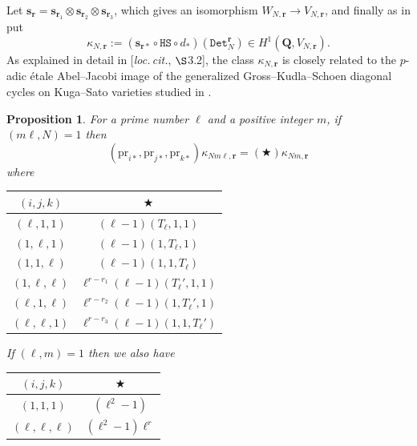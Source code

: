 \documentclass[10pt,letterpaper]{amsart}
\theoremstyle{plain}
\theoremstyle{definition}
\newtheorem{rmk}[thm]{Remark}
\theoremstyle{definition}
\theoremstyle{plain}
\newtheorem{prop}[thm]{Proposition}
\theoremstyle{plain}
\theoremstyle{plain}
\theoremstyle{remark}
\numberwithin{equation}{section}
\newcommand{\Q}{\mathbf{Q}}
\begin{document}
Let $\mathbf{s}_{\mathbf{r}}=\mathbf{s}_{\mathbf{r}_1}\otimes \mathbf{s}_{\mathbf{r}_2}\otimes \mathbf{s}_{\mathbf{r}_3}$, which gives an isomorphism $W_{N,\mathbf{r}}\rightarrow V_{N,\mathbf{r}}$, and finally as in \cite{BSV} put
\begin{equation}\label{BSVconstructclass}
    \kappa_{N,\mathbf{r}}:=(\mathbf{s}_{\mathbf{r}*}\circ\mathtt{HS}\circ d_{*})(\mathtt{Det}^{\mathbf{r}}_N)\in H^1(\Q,V_{N,\mathbf{r}}).
\end{equation}
As explained in detail in  [\emph{loc.\,cit.}, $\S${3.2}], the class  $\kappa_{N,\mathbf{r}}$ is closely related to the $p$-adic \'etale Abel--Jacobi image of the generalized Gross--Kudla--Schoen diagonal cycles on Kuga--Sato varieties studied in \cite{DR1}.


\begin{prop}\label{table}
For a prime number $\ell$ and a positive integer $m$, if $(m\ell,N)=1$ then
\begin{equation*}
({\mathrm{pr}}_{i*},{\mathrm{pr}}_{j*},{\mathrm{pr}}_{k*})\kappa_{Nm\ell,\textbf{r}}= (\bigstar)\kappa_{Nm,\textbf{r}}
\end{equation*}
where
\begin{center}
\begin{tabular}{|c|c| } 
 \hline
 $(i,j,k)$ & $\bigstar$  \\ 
 \hline
  $(\ell,1,1)$& $(\ell-1)(T_\ell,1,1)$  \\ 
  $(1,\ell,1)$&  $(\ell-1)(1,T_\ell,1)$     \\
  $(1,1,\ell)$& $(\ell-1)(1,1,T_\ell)$ \\
  $(1,\ell,\ell)$& $\ell^{r-r_1}(\ell-1)(T_\ell',1,1)$\\
  $(\ell,1,\ell)$& $\ell^{r-r_2}(\ell-1)(1,T_\ell',1)$ \\
  $(\ell,\ell,1)$& $\ell^{r-r_3}(\ell-1)(1,1,T_\ell')$ \\
 \hline
\end{tabular}
\end{center}
If $(\ell,m)=1$ then we also have
\begin{center}
\begin{tabular}{|c|c| } 
 \hline
 $(i,j,k)$ & $\bigstar$  \\ 
 \hline
  $(1,1,1)$& $(\ell^2-1)$  \\ 
  $(\ell,\ell,\ell)$&  $(\ell^2-1)\ell^r$     \\
 
 \hline
\end{tabular}
\end{center}
\end{prop}
\end{document}
